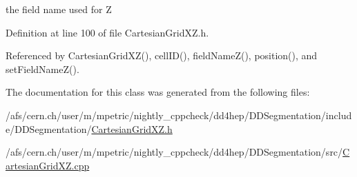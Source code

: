 the field name used for Z 

Definition at line 100 of file CartesianGridXZ.h.

Referenced by CartesianGridXZ(), cellID(), fieldNameZ(), position(), and setFieldNameZ().

The documentation for this class was generated from the following files:\begin{DoxyCompactItemize}
\item 
/afs/cern.ch/user/m/mpetric/nightly\_\-cppcheck/dd4hep/DDSegmentation/include/DDSegmentation/\hyperlink{_d_d_segmentation_2include_2_d_d_segmentation_2_cartesian_grid_x_z_8h}{CartesianGridXZ.h}\item 
/afs/cern.ch/user/m/mpetric/nightly\_\-cppcheck/dd4hep/DDSegmentation/src/\hyperlink{_d_d_segmentation_2src_2_cartesian_grid_x_z_8cpp}{CartesianGridXZ.cpp}\end{DoxyCompactItemize}

